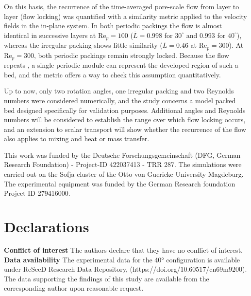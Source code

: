 On this basis, the recurrence of the time-averaged pore-scale flow from layer to layer (flow locking) was quantified with a similarity metric applied to the velocity fields in the in-plane system. In both periodic packings the flow is almost identical in successive layers at Re$_p=100$ ($\overline{L}=0.998$ for $30^\circ$ and $0.993$ for $40^\circ$), whereas the irregular packing shows little similarity ($\overline{L}=0.46$ at Re$_p=300$). At Re$_p=300$, both periodic packings remain strongly locked. Because the flow repeats , a single periodic module  can represent the developed region of such a bed, and the metric offers a way to check this assumption quantitatively.

Up to now, only two rotation angles, one irregular packing and two Reynolds numbers were considered numerically, and the study concerns a model packed bed designed specifically for validation purposes. Additional angles and Reynolds numbers will be considered to establish the range over which flow locking occurs, and an extension to scalar transport will show whether the recurrence of the flow also applies to mixing and heat or mass transfer.

\begin{acknowledgments}
This work was funded by the Deutsche Forschungsgemeinschaft (DFG, German Research Foundation) - Project-ID 422037413 - TRR 287. The simulations were carried out on the Sofja cluster of the Otto von Guericke University Magdeburg.
The experimental equipment was funded by the German Research foundation Project-ID 279416000.
\end{acknowledgments}

\section*{Declarations}
\textbf{Conflict of interest} The authors declare that they have no conflict of interest.\\
\textbf{Data availability} The experimental data for the 40° configuration is available under ReSeeD Research Data Repository, (https://doi.org/10.60517/cn69m9200). The data supporting the findings of this study are available from the corresponding author upon reasonable request.

